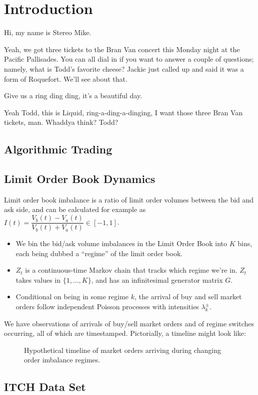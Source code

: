 \chapter{Introduction}

Hi, my name is Stereo Mike.

Yeah, we got three tickets to the Bran Van concert this Monday night at the Pacific Pallisades. You can all dial in if you want to answer a couple of questions; namely, what is Todd's favorite cheese? Jackie just called up and said it was a form of Roquefort. We'll see about that.

Give us a ring ding ding, it's a beautiful day.

Yeah Todd, this is Liquid, ring-a-ding-a-dinging, I want those three Bran Van tickets, man. Whaddya think? Todd?

\section{Algorithmic Trading}


\section{Limit Order Book Dynamics}



Limit order book imbalance is a ratio of limit order volumes between the bid and ask side, and can be calculated for example as $I(t) = \dfrac{V_b(t) - V_a(t)}{V_b(t) + V_a(t)} \in [-1,1]$.
\begin{itemize}
\item We bin the bid/ask volume imbalances in the Limit Order Book into $K$ bins, each being dubbed a ``regime'' of the limit order book. 
\item $Z_t$ is a continuous-time Markov chain that tracks which regime we're in. $Z_t$ takes values in $\{1, \dots , K\}$, and has an infinitesimal generator matrix $G$.
\item Conditional on being in some regime $k$, the arrival of buy and sell market orders follow independent Poisson processes with intensities $\lambda^{\pm}_k$.
\end{itemize}

We have observations of arrivals of buy/sell market orders and of regime switches occurring, all of which are timestamped. Pictorially, a timeline might look like:
\begin{figure}[H]
  
\caption{Hypothetical timeline of market orders arriving during changing order imbalance regimes.}
\label{introtimeline}
\end{figure}

\section{ITCH Data Set}
